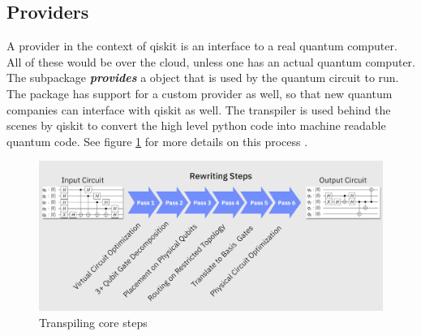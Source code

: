 \documentclass[conference]{IEEEtran}
\begin{document}
\subsection{Providers}
A provider in the context of qiskit is an interface to a real quantum computer. 
All of these would be over the cloud, unless one has an actual quantum computer. 
The  subpackage \textbf{\textit{provides}} a  object that is used by the quantum circuit to run.
The package has support for a custom provider as well, so that new quantum companies can interface with qiskit as well. 
The transpiler  is used behind the scenes by qiskit to convert the high level python code into machine readable quantum code. See figure \ref{fig:transpile} for more details on this process .

\begin{figure}
    \centering
    \includegraphics[width=\linewidth]{images/transpiling_core_steps.png}
    \caption{Transpiling core steps}
    \label{fig:transpile}
\end{figure}
\end{document}

